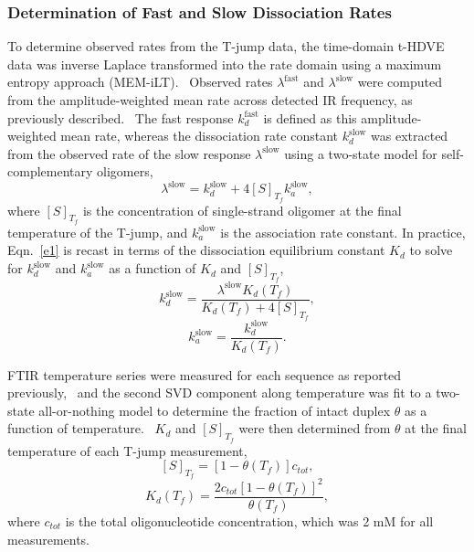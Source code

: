 \documentclass[journal=jpcbfk,manuscript=article]{achemso}
\begin{document}
\subsubsection{Determination of Fast and Slow Dissociation Rates}\label{sec:TjumpAnalysis}

To determine observed rates from the T-jump data, the time-domain t-HDVE data was inverse Laplace transformed into the rate domain using a maximum entropy approach (MEM-iLT).~\citep{Kumar2001OnTimescales} Observed rates $\lambda^\mathrm{fast}$ and $\lambda^\mathrm{slow}$ were computed from the amplitude-weighted mean rate across detected IR frequency, as previously described.~\citep{Sanstead2018DirectDehybridization} The fast response $k_d^\mathrm{fast}$ is defined as this amplitude-weighted mean rate, whereas the dissociation rate constant $k_d^\mathrm{slow}$ was extracted from the observed rate of the slow response $\lambda^\mathrm{slow}$ using a two-state model for self-complementary oligomers,~\citep{Bernasconi2012RelaxationKinetics}
	\begin{equation}\label{e1}
	\lambda^\mathrm{slow} = k_d^\mathrm{slow} + 4[S]_{T_f}k_a^\mathrm{slow},
	\end{equation}
where $[S]_{T_f}$ is the concentration of single-strand oligomer at the final temperature of the T-jump, and $k_a^\mathrm{slow}$ is the association rate constant. In practice, Eqn.~\ref{e1} is recast in terms of the dissociation equilibrium constant $K_d$ to solve for $k_d^\mathrm{slow}$ and $k_a^\mathrm{slow}$ as a function of $K_d$ and $[S]_{T_f}$,
	\begin{equation}\label{e2a}
	k_d^\mathrm{slow} = \frac{\lambda^\mathrm{slow}K_d(T_f)}{K_d(T_f)+4[S]_{T_f}},
	\end{equation}
	\begin{equation}\label{e2b}
	k_a^\mathrm{slow} = \frac{k_d^\mathrm{slow}}{K_d(T_f)}.
	\end{equation}

FTIR temperature series were measured for each sequence as reported previously,~\citep{Sanstead2016} and the second SVD component along temperature was fit to a two-state all-or-nothing model to determine the fraction of intact duplex $\theta$ as a function of temperature.~\citep{Marky1987CalculatingCurves} $K_d$ and $[S]_{T_f}$ were then determined from $\theta$ at the final temperature of each T-jump measurement,
	\begin{equation}\label{e3a}
	[S]_{T_f} = [1 - \theta(T_f)]c_{tot},
	\end{equation}
	\begin{equation}\label{e3b}
	K_d(T_f) = \frac{2c_{tot}[1 - \theta(T_f)]^2}{\theta(T_f)},
	\end{equation}
where $c_{tot}$ is the total oligonucleotide concentration, which was 2 mM for all measurements.
\end{document}
